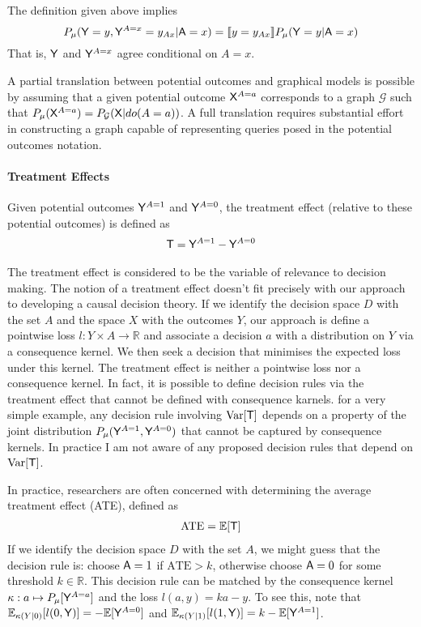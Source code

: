 The definition given above implies
\[P_{\mu}(\mathsf{Y}=y,\mathsf{Y}^{A=x}=y_{Ax}|\mathsf{A}=x) = \llbracket y=y_{Ax} \rrbracket P_\mu(\mathsf{Y}=y|\mathsf{A}=x)\]
That is, $\mathsf{Y}$ and $\mathsf{Y}^{A=x}$ agree conditional on $A=x$.

A partial translation between potential outcomes and graphical models is possible by assuming that a given potential outcome $\mathsf{X}^{A=a}$ corresponds to a graph $\mathcal{G}$ such that $P_\mu(\mathsf{X}^{A=a})=P_{\mathcal{G}}(\mathsf{X}|do(A=a))$. A full translation requires substantial effort in constructing a graph capable of representing queries posed in the potential outcomes notation\cite{shpitser_complete_2008}.

\paragraph{Treatment Effects}\label{sec:treatment_effect}

Given potential outcomes $\mathsf{Y}^{A=1}$ and $\mathsf{Y}^{A=0}$, the treatment effect (relative to these potential outcomes) is defined as 
\begin{align}
    \mathsf{T} = \mathsf{Y}^{A=1} - \mathsf{Y}^{A=0}
\end{align}

The treatment effect is considered to be the variable of relevance to decision making. The notion of a treatment effect doesn't fit precisely with our approach to developing a causal decision theory. If we identify the decision space $D$ with the set $A$ and the space $X$ with the outcomes $Y$, our approach is define a pointwise loss $l:Y\times A\to \mathbb{R}$ and associate a decision $a$ with a distribution on $Y$ via a consequence kernel. We then seek a decision that minimises the expected loss under this kernel. The treatment effect is neither a pointwise loss nor a consequence kernel. In fact, it is possible to define decision rules via the treatment effect that cannot be defined with consequence karnels. for a very simple example, any decision rule involving $\text{Var}[\mathsf{T}]$ depends on a property of the joint distribution $P_{\mu}(\mathsf{Y}^{A=1}, \mathsf{Y}^{A=0})$ that cannot be captured by consequence kernels\cite{lattimore_learning_2017}. In practice I am not aware of any proposed decision rules that depend on $\text{Var}[\mathsf{T}]$.

In practice, researchers are often concerned with determining the average treatment effect (ATE), defined as 
\begin{align}
   \text{ATE}=\mathbb{E}[\mathsf{T}] 
\end{align}
If we identify the decision space $D$ with the set $A$, we might guess that the decision rule is: choose $\mathsf{A}=1$ if $\text{ATE}>k$, otherwise choose $\mathsf{A}=0$ for some threshold $k\in \mathbb{R}$. This decision rule can be matched by the consequence kernel $\kappa:a\mapsto P_{\mu}[\mathsf{Y}^{A=a}]$ and the loss $l(a,y)=ka - y$. To see this, note that $\mathbb{E}_{\kappa(Y|0)}[l(0,\mathsf{Y})] = -\mathbb{E}[\mathsf{Y}^{A=0}]$ and $\mathbb{E}_{\kappa(Y|1)}[l(1,\mathsf{Y})] = k-\mathbb{E}[\mathsf{Y}^{A=1}]$.


